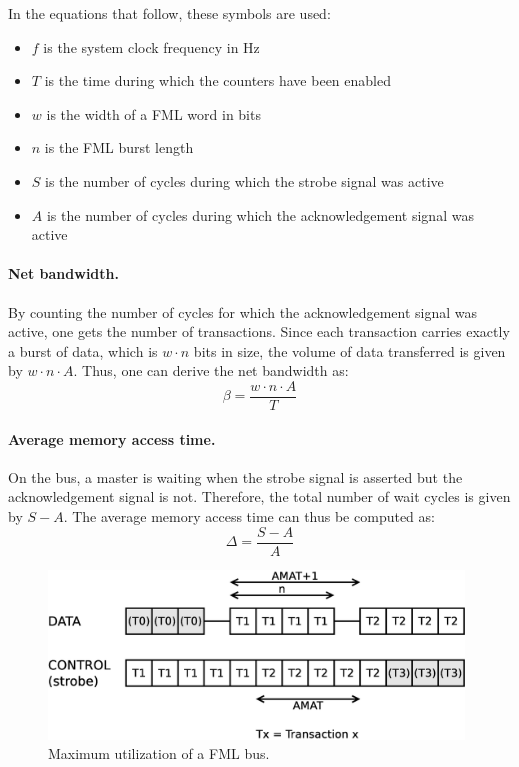 \documentclass[a4paper,11pt]{kthesis}
\begin{document}
In the equations that follow, these symbols are used:
\begin{itemize}
\item $f$ is the system clock frequency in Hz
\item $T$ is the time during which the counters have been enabled
\item $w$ is the width of a FML word in bits
\item $n$ is the FML burst length
\item $S$ is the number of cycles during which the strobe signal was active
\item $A$ is the number of cycles during which the acknowledgement signal was active
\end{itemize}

\paragraph{Net bandwidth.} By counting the number of cycles for which the acknowledgement signal was active, one gets the number of transactions. Since each transaction carries exactly a burst of data, which is $w \cdot n$ bits in size, the volume of data transferred is given by $w \cdot n \cdot A $. Thus, one can derive the net bandwidth as:
\begin{equation}
\beta = \frac{w \cdot n \cdot A}{T}
\end{equation}

\paragraph{Average memory access time.} On the bus, a master is waiting when the strobe signal is asserted but the acknowledgement signal is not. Therefore, the total number of wait cycles is given by $S-A$. The average memory access time can thus be computed as:
\begin{equation}
\Delta = \frac{S-A}{A}
\end{equation}

\begin{figure}
\centering
\includegraphics[height=45mm]{fmlmax.eps}
\caption{Maximum utilization of a FML bus.} \label{fig:fmlmax}
\end{figure}
\end{document}
